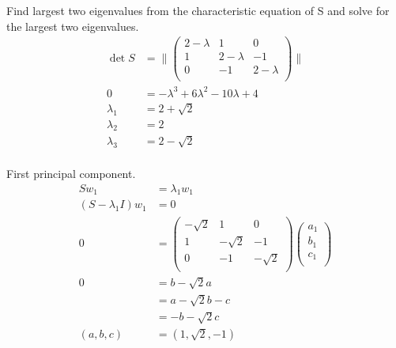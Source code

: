 \documentclass[newpage]{homework}
\begin{document}
Find largest two eigenvalues from the characteristic equation of S and solve for the largest two eigenvalues.
\begin{align*}
    \det{S} &=	\lVert \begin{pmatrix}
                2 - \lambda & 1 & 0     \\
                1 & 2 - \lambda & -1    \\
                0 & -1 & 2 - \lambda   \\
                \end{pmatrix} \rVert    \\
    0   &=  -\lambda^3 + 6\lambda^2 - 10\lambda + 4 \\
    \lambda_1   &=  2 + \sqrt{2}    \\
    \lambda_2   &=  2   \\ 
    \lambda_3   &=  2 - \sqrt{2}   \\
\end{align*}

First principal component.
\begin{align*}
    Sw_1	&=	\lambda_1 w_1	\\
    (S - \lambda_1 I) w_1 &=  0   \\
    0   &=  \begin{pmatrix}
            - \sqrt{2} & 1 & 0   \\
            1 & - \sqrt{2} & -1  \\
            0 & -1 & - \sqrt{2}  \\
            \end{pmatrix}
            \begin{pmatrix}
            a_1    \\
            b_1    \\
            c_1    \\
            \end{pmatrix}   \\
    0   &=  b - \sqrt{2} a  \\
        &=  a - \sqrt{2} b - c  \\
        &=  -b - \sqrt{2} c \\
    (a, b, c)   &=  \boxed{(1, \sqrt{2}, -1)}   \\
\end{align*}
\end{document}
